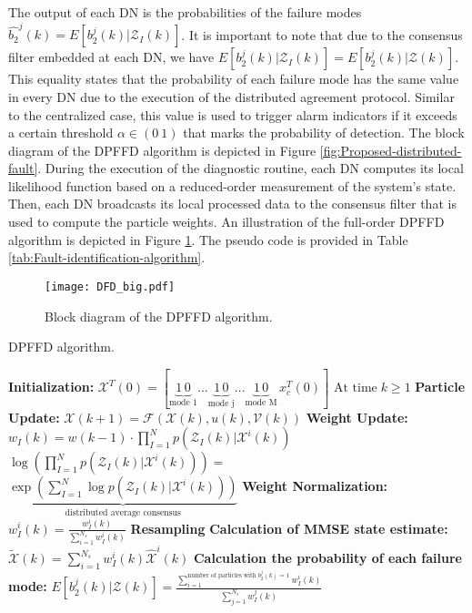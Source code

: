 \documentclass[10pt,twocolumn,twoside]{IEEEtran}
\begin{document}
The output of each DN is the probabilities of the failure modes $\hat{b_{2}}^{j}\left(k\right)=E\left[b_{2}^{j}\left(k\right)|\mathcal{Z}_{I}\left(k\right)\right]$.
It is important to note that due to the consensus filter embedded
at each DN, we have $E\left[b_{2}^{j}\left(k\right)|\mathcal{Z}_{I}\left(k\right)\right]=E\left[b_{2}^{j}\left(k\right)|\mathcal{Z}\left(k\right)\right]$.
This equality states that the probability of each failure mode has
the same value in every DN due to the execution of the distributed
agreement protocol. Similar to the centralized case, this value is
used to trigger alarm indicators if it exceeds a certain threshold
$\alpha\in\left(0\:1\right)$ that marks the probability of detection.
The block diagram of the DPFFD algorithm is depicted in Figure \ref{fig:Proposed-distributed-fault}.
During the execution of the diagnostic routine, each DN computes its
local likelihood function based on a reduced-order measurement of
the system's state. Then, each DN broadcasts its local processed data
to the consensus filter that is used to compute the particle weights.
An illustration of the full-order DPFFD algorithm is depicted in Figure
\ref{fig:Schematic-of-distributed}. The pseudo code is provided in Table \ref{tab:Fault-identification-algorithm}.

\begin{figure}
\centering{}\texttt{[image: DFD\_big.pdf]}\caption{Block diagram of the DPFFD algorithm. \label{fig:Schematic-of-distributed}}
\end{figure}

\begin{table}
\caption{DPFFD algorithm. \label{tab:Fault-identification-algorithm}}
\begin{algorithmic}[1]
\Statex \textbf{Initialization:}
\State $\mathcal{X}^T(0)=[\underbrace{1\,0}_{\text{mode 1}}  ...\underbrace{1\,0}_{\text{mode j}} ... \underbrace{1\,0} _{\text{mode M}}\, x_c ^T(0)]$
\State $\text{At time}\;k\ge 1$
\Statex \textbf{Particle Update:}
\State $\mathcal{X}(k+1)=\mathcal{F}(\mathcal{X}(k),u(k),\mathcal{V}(k))$
\Statex \textbf{Weight Update:}
\State $w_I(k)=w(k-1)\cdot\prod_{I=1} ^N p(\mathcal{Z}_I(k)|\mathcal{X}^i (k))$
\State $\log\left(\prod_{I=1} ^N p(\mathcal{Z}_I(k)|\mathcal{X}^i (k))\right)=$\\
\Statex $\underbrace{\exp(\sum_{I=1} ^N \log p(\mathcal{Z}_I(k)|\mathcal{X}^i (k)))}_{\text{distributed average consensus}}$
\Statex \textbf{Weight Normalization:}
\State $w^i _I(k)=\frac{w^i _I(k)}{\sum_{i=1} ^{N_s} w^i _I(k)}$
\Statex \textbf{Resampling}
\Statex \textbf{Calculation of MMSE state estimate:}
\State $\tilde{\mathcal{X}}(k)=\sum_{i=1} ^{N_s} w^i _I(k)\hat{\mathcal{X}}^i(k) $
\Statex \textbf{Calculation the probability of each failure mode:}
\State $E[b_2 ^j(k)|\mathcal{Z}(k)]=\frac{\sum_{i=1} ^{\text{number of particles with}\;b_2 ^j(k)=1} w^i _I(k)}{\sum_{j=1} ^{N_s} w^j _I(k)}$
\EndFor

\EndFor
\end{algorithmic}
\end{table}
\end{document}
